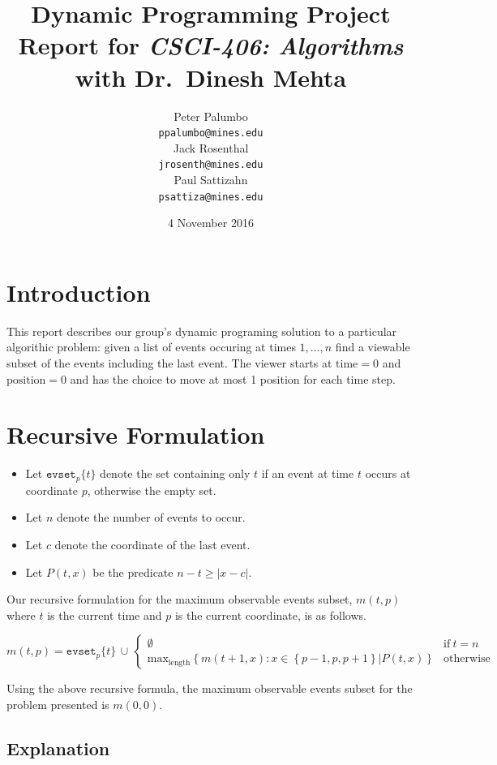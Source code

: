 \documentclass[titlepage,12pt]{article}
\title{\textbf{Dynamic Programming Project} \\ {\small Report for \emph{CSCI-406:
Algorithms} with Dr.~Dinesh Mehta}}
\author{%
    Peter Palumbo \\ {\small\texttt{ppalumbo@mines.edu}} \\[12pt]
    Jack Rosenthal \\ {\small\texttt{jrosenth@mines.edu}} \\[12pt]
    Paul Sattizahn \\ {\small\texttt{psattiza@mines.edu}} \\
}
\date{4 November 2016}
\let\ge=\geqslant
\begin{document}
\maketitle
\section{Introduction}

This report describes our group's dynamic programing solution to a particular
algorithic problem: given a list of events occuring at times $1,\ldots,n$ find
a viewable subset of the events including the last event. The viewer starts at
$\text{time}=0$ and $\text{position}=0$ and has the choice to move at most 1
position for each time step.

\section{Recursive Formulation}

\begin{itemize}
    \item Let $\mathtt{evset}_p\{t\}$ denote the set containing only $t$ if an event
        at time $t$ occurs at coordinate $p$, otherwise the empty set.
    \item Let $n$ denote the number of events to occur.
    \item Let $c$ denote the coordinate of the last event.
    \item Let $P(t, x)$ be the predicate $n - t \ge |x - c|$.
\end{itemize}

Our recursive formulation for the maximum observable events subset, $m(t, p)$
where $t$ is the current time and $p$ is the current coordinate, is as
follows.

\begin{displaymath}
    m(t, p) = \mathtt{evset}_p\{t\}\, \cup\,
    \begin{cases}
        \emptyset & \text{if}\ t = n \\
        \text{max}_{\text{length}} \left\{m(t + 1, x) :
        x \in \left\{p - 1, p, p + 1\right\} | P(t, x)
        \right\} & \text{otherwise}
    \end{cases}
\end{displaymath}

Using the above recursive formula, the maximum observable events subset for the
problem presented is $m(0, 0)$.

\subsection{Explanation}
\end{document}

